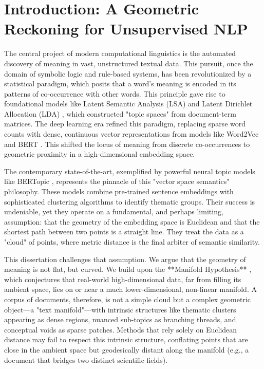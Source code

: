 \chapter{Introduction: A Geometric Reckoning for Unsupervised NLP}
\label{chap:introduction}

The central project of modern computational linguistics is the automated discovery of meaning in vast, unstructured textual data. This pursuit, once the domain of symbolic logic and rule-based systems, has been revolutionized by a statistical paradigm, which posits that a word's meaning is encoded in its patterns of co-occurrence with other words. This principle gave rise to foundational models like Latent Semantic Analysis (LSA) and Latent Dirichlet Allocation (LDA) \citep{blei2003latent}, which constructed "topic spaces" from document-term matrices. The deep learning era refined this paradigm, replacing sparse word counts with dense, continuous vector representations from models like Word2Vec \citep{pennington2014glove} and BERT \citep{devlin2018bert}. This shifted the locus of meaning from discrete co-occurrences to geometric proximity in a high-dimensional embedding space.

The contemporary state-of-the-art, exemplified by powerful neural topic models like BERTopic \citep{grootendorst2022bertopic}, represents the pinnacle of this "vector space semantics" philosophy. These models combine pre-trained sentence embeddings with sophisticated clustering algorithms to identify thematic groups. Their success is undeniable, yet they operate on a fundamental, and perhaps limiting, assumption: that the geometry of the embedding space is Euclidean and that the shortest path between two points is a straight line. They treat the data as a "cloud" of points, where metric distance is the final arbiter of semantic similarity.

This dissertation challenges that assumption. We argue that the geometry of meaning is not flat, but curved. We build upon the **Manifold Hypothesis** \citep{belkin2003laplacian}, which conjectures that real-world high-dimensional data, far from filling its ambient space, lies on or near a much lower-dimensional, non-linear manifold. A corpus of documents, therefore, is not a simple cloud but a complex geometric object—a "text manifold"—with intrinsic structures like thematic clusters appearing as dense regions, nuanced sub-topics as branching threads, and conceptual voids as sparse patches. Methods that rely solely on Euclidean distance may fail to respect this intrinsic structure, conflating points that are close in the ambient space but geodesically distant along the manifold (e.g., a document that bridges two distinct scientific fields).


